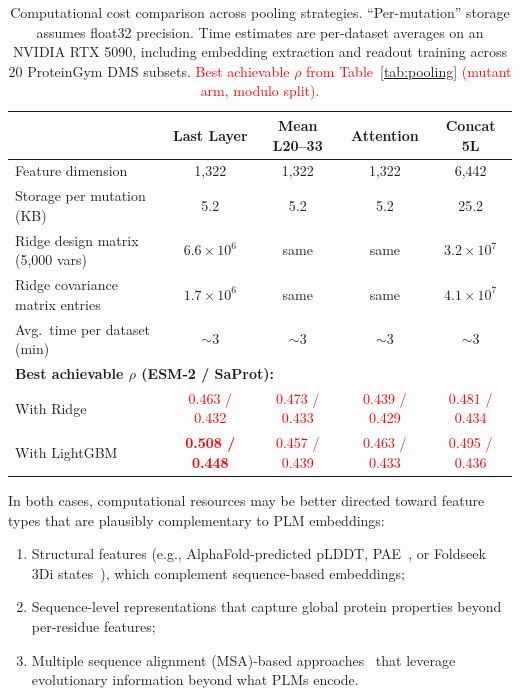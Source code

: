 \documentclass[11pt,a4paper]{article}
\newcommand{\revised}[1]{\textcolor{red}{#1}}
\begin{document}
\begin{table}[ht]
\centering
\caption{Computational cost comparison across pooling strategies.
``Per-mutation'' storage assumes float32 precision. Time estimates are
per-dataset averages on an NVIDIA RTX 5090, including embedding extraction
and readout training across 20 ProteinGym DMS subsets.
\revised{Best achievable $\rho$ from Table~\ref{tab:pooling} (mutant arm,
modulo split).}}
\label{tab:cost}
\begin{tabular}{lcccc}
\toprule
& Last Layer & Mean L20--33 & Attention & Concat 5L \\
\midrule
Feature dimension                  & 1,322 & 1,322 & 1,322 & 6,442 \\
Storage per mutation (KB)          & 5.2   & 5.2   & 5.2   & 25.2 \\
Ridge design matrix (5,000 vars)   & $6.6 \times 10^6$ & same & same & $3.2 \times 10^7$ \\
Ridge covariance matrix entries    & $1.7 \times 10^6$ & same & same & $4.1 \times 10^7$ \\
Avg.\ time per dataset (min)       & $\sim$3 & $\sim$3 & $\sim$3 & $\sim$3 \\
\midrule
\multicolumn{5}{l}{\small \textbf{Best achievable $\rho$ (ESM-2 / SaProt):}} \\
\quad With Ridge                    & \revised{0.463 / 0.432} & \revised{0.473 / 0.433} & \revised{0.439 / 0.429} & \revised{0.481 / 0.434} \\
\quad With LightGBM                 & \textbf{\revised{0.508 / 0.448}} & \revised{0.457 / 0.439} & \revised{0.463 / 0.433} & \revised{0.495 / 0.436} \\
\bottomrule
\end{tabular}
\end{table}

In both cases, computational resources may be better directed toward feature types
that are plausibly complementary to PLM embeddings:
\begin{enumerate}
    \item Structural features (e.g., AlphaFold-predicted pLDDT, PAE~\cite{jumper2021alphafold},
          or Foldseek 3Di states~\cite{vankempen2024foldseek}), which complement
          sequence-based embeddings;
    \item Sequence-level representations that capture global protein properties
          beyond per-residue features;
    \item Multiple sequence alignment (MSA)-based approaches~\cite{riesselman2018deepsequence,
          hopf2017mutation} that leverage evolutionary information beyond what PLMs encode.
\end{enumerate}
\end{document}
